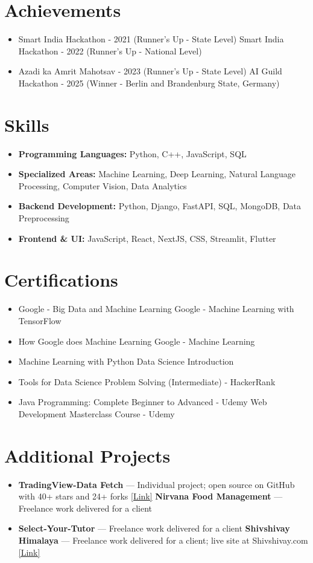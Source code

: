 \documentclass[a4paper,10pt]{article}
\begin{document}
\section*{Achievements}
\begin{itemize}
\item Smart India Hackathon - 2021 (Runner's Up - State Level) \hfill Smart India Hackathon - 2022 (Runner's Up - National Level)
\item Azadi ka Amrit Mahotsav - 2023 (Runner's Up - State Level) \hfill AI Guild Hackathon - 2025 (Winner - Berlin and Brandenburg State, Germany)
\end{itemize}

\section*{Skills}
\begin{itemize}
  \item \textbf{Programming Languages:} Python, C++, JavaScript, SQL
  \item \textbf{Specialized Areas:} Machine Learning, Deep Learning, Natural Language Processing, Computer Vision, Data Analytics
  \item \textbf{Backend Development:} Python, Django, FastAPI, SQL, MongoDB, Data Preprocessing
  \item \textbf{Frontend \& UI:} JavaScript, React, NextJS, CSS, Streamlit, Flutter
\end{itemize}

\section*{Certifications}
\begin{itemize}
\item Google - Big Data and Machine Learning \hfill Google - Machine Learning with TensorFlow
\item How Google does Machine Learning \hfill Google - Machine Learning
\item Machine Learning with Python \hfill Data Science Introduction
\item Tools for Data Science \hfill Problem Solving (Intermediate) - HackerRank
\item Java Programming: Complete Beginner to Advanced - Udemy \hfill Web Development Masterclass Course - Udemy
\end{itemize}

\section*{Additional Projects}
\begin{itemize}
\item \textbf{TradingView-Data Fetch} — Individual project; open source on GitHub with 40+ stars and 24+ forks \href{https://github.com/ravalmeet/TradingView}{[Link]} \hfill \textbf{Nirvana Food Management} — Freelance work delivered for a client
\item \textbf{Select-Your-Tutor} — Freelance work delivered for a client \hfill \textbf{Shivshivay Himalaya} — Freelance work delivered for a client; live site at Shivshivay.com \href{Shivshivay.com}{[Link]}
\end{itemize}
\end{document}
